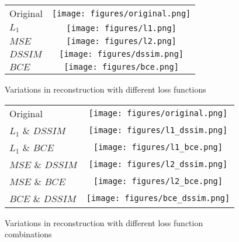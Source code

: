 \begin{figure}[!h]
\vspace{-2mm}
\centering
\footnotesize
\begin{tabular}{m{1.5cm} c }
 Original    	&	\texttt{[image: figures/original.png]}		\\ 
 $L_1$ 			&   \texttt{[image: figures/l1.png]}	\\ 
 $MSE$ 			& 	\texttt{[image: figures/l2.png]}	\\
 $DSSIM$ 		& 	\texttt{[image: figures/dssim.png]}	\\
 $BCE$ 			& 	\texttt{[image: figures/bce.png]}	\\ 
\end{tabular}
\caption{Variations in reconstruction with different loss functions }
\label{real_and_recon_loss}
\vspace{-3mm}
\end{figure}

\begin{figure}[!h]
\centering
\footnotesize
\begin{tabular}{m{2.2cm} c }
Original         		&	\texttt{[image: figures/original.png]}		\\ 
$L_1$ \& $DSSIM$		&   \texttt{[image: figures/l1\_dssim.png]}	\\ 
$L_1$ \& $BCE$			& 	\texttt{[image: figures/l1\_bce.png]}	\\
$MSE$ \& $DSSIM$ 		& 	\texttt{[image: figures/l2\_dssim.png]}	\\
$MSE$ \& $BCE$			& 	\texttt{[image: figures/l2\_bce.png]}	\\ 
$BCE$ \& $DSSIM$		&	\texttt{[image: figures/bce\_dssim.png]}	\\
\end{tabular}
\caption{Variations in reconstruction with different loss function combinations}
\label{real_and_recon_loss_comb}
\end{figure}


